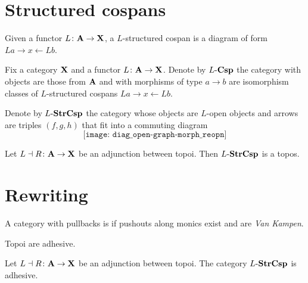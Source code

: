 \documentclass{amsart}
\begin{document}
\section{Structured cospans}
\label{sec_structured-cospans}
	
\begin{df} \label{df_structured-cospans}
	Given a functor $ L \colon \mathbf{A} \to \mathbf{X} $, a $ L $-structured cospan is a diagram of form $ L a \to x \gets L b $. 
\end{df}
	
\begin{df} \label{df_(-)Csp-category}
	Fix a category $ \mathbf{X} $ and a functor $ L \colon \mathbf{A} \to \mathbf{X} $. Denote by $  L  \text{-} \mathbf{Csp} $ the category with objects are those from $ \mathbf{A} $ and with morphisms of type $ a \to b $ are isomorphism classes of $ L $-structured cospans $ La \to x \gets Lb $.
\end{df}

\begin{df} \label{df_StrCsp-category}
	Denote by $ L \text{-} \mathbf{StrCsp} $ the category whose objects are $ L $-open objects and arrows are triples $ (f,g,h) $ that fit into a commuting diagram
	\[
	\texttt{[image: diag\_open-graph-morph\_reopn]}
	\]
\end{df}

\begin{thm} \label{thm_StrCsp-topos}
	Let $ L \dashv R \colon \mathbf{A} \to \mathbf{X} $ be an adjunction between topoi.  Then $ L \text{-} \mathbf{StrCsp} $ is a topos.  
\end{thm}

\section{Rewriting}

\begin{df} \label{df_adhesive-category}
	A category with pullbacks is  if pushouts along monics exist and are \emph{Van Kampen}.
\end{df} 

\begin{thm} \label{thm_topoi-adhesive}
	Topoi are adhesive.
\end{thm}

\begin{cor} \label{thm_category-StrCsp-adhsv}
	Let $ L \dashv R \colon \mathbf{A} \to \mathbf{X} $ be an adjunction between topoi.  The category $ L \text{-} \mathbf{StrCsp} $ is adhesive.
\end{cor}
\end{document}
